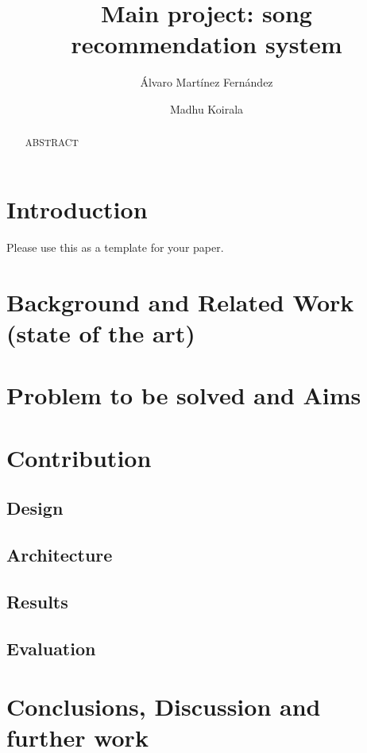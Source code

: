 \documentclass{jot}
\title{Main project: song recommendation system}
\author[affiliation=UiT, nowrap]
    {\'{A}lvaro Mart\'{i}nez Fern\'{a}ndez}
    { is a master student in Computer Science at the University of Troms\o. You can contact him at \email{afe026@uit.no}.}
\author[affiliation=UiT, nowrap]
    {Madhu Koirala}
    {is a master student in Computer Science at the University of Troms\o. You can contact him at \email{mko075@uit.no}.}
\affiliation{UiT}{University of Troms\o, Norway\\
\url{https://uit.no/startsida}}
\begin{document}
\begin{abstract}
ABSTRACT
\end{abstract}


\tableofcontents

\section{Introduction}

Please use this as a template for your paper.

\section{Background and Related Work (state of the art)}

\section{Problem to be solved and Aims}

\section{Contribution}

\subsection{Design}
\subsection{Architecture}
\subsection{Results}
\subsection{Evaluation}

\section{Conclusions, Discussion and further work}

\abouttheauthors
\end{document}
